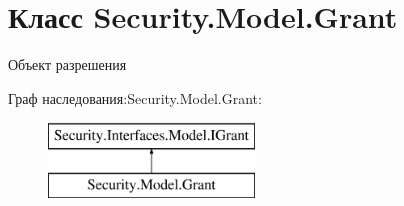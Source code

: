 \hypertarget{class_security_1_1_model_1_1_grant}{}\section{Класс Security.\+Model.\+Grant}
\label{class_security_1_1_model_1_1_grant}


Объект разрешения  


Граф наследования\+:Security.\+Model.\+Grant\+:\begin{figure}[H]
\begin{center}
\leavevmode
\includegraphics[height=2.000000cm]{dd/d50/class_security_1_1_model_1_1_grant}
\end{center}
\end{figure}
